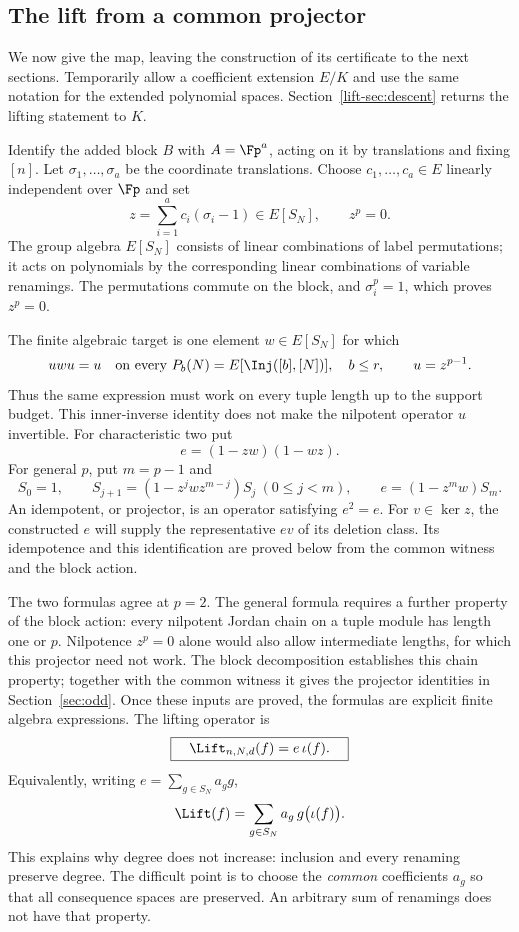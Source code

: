 \subsection{The lift from a common projector}\label{lift-sec:formula}
We now give the map, leaving the construction of its certificate to the
next sections. Temporarily allow a coefficient extension $E/K$ and use
the same notation for the extended polynomial spaces. Section~\ref{lift-sec:descent}
returns the lifting statement to $K$.

Identify the added block $B$ with $A=\Fp^a$, acting on it by translations
and fixing $[n]$. Let $\sigma_1,\ldots,\sigma_a$ be the coordinate
translations. Choose $c_1,\ldots,c_a\in E$ linearly independent over
$\Fp$ and set
\[
 z=\sum_{i=1}^a c_i(\sigma_i-1)\in E[S_N],\qquad z^p=0.
\]
The group algebra $E[S_N]$ consists of linear combinations of label
permutations; it acts on polynomials by the corresponding linear
combinations of variable renamings. The permutations commute on the
block, and $\sigma_i^p=1$, which proves $z^p=0$.

The finite algebraic target is one element $w\in E[S_N]$ for which
\begin{equation}\label{lift-eq:witness}
 u w u=u\quad\text{on every }P_b(N)=E[\Inj([b],[N])],\quad b\le r,
 \qquad u=z^{p-1}.
\end{equation}
Thus the same expression must work on every tuple length up to the
support budget. This inner-inverse identity does not make the
nilpotent operator $u$ invertible. For characteristic two put
\[
                         e=(1-zw)(1-wz).
\]
For general $p$, put $m=p-1$ and
\begin{equation}\label{lift-eq:projector}
 S_0=1,\qquad S_{j+1}=(1-z^jwz^{m-j})S_j\ (0\le j<m),
 \qquad e=(1-z^mw)S_m.
\end{equation}
An idempotent, or projector, is an operator satisfying $e^2=e$.
For $v\in\ker z$, the constructed $e$ will supply the representative
$ev$ of its deletion class. Its idempotence and this identification
are proved below from the common witness and the block action.

The two formulas agree at $p=2$. The general formula requires a further
property of the block action: every nilpotent Jordan chain on a tuple
module has length one or $p$. Nilpotence $z^p=0$ alone would also allow
intermediate lengths, for which this projector need not work. The
block decomposition establishes this chain property; together with
the common witness it gives the projector identities in
Section~\ref{sec:odd}. Once these inputs are
proved, the formulas are explicit finite algebra expressions. The lifting operator is
\begin{equation}\label{lift-eq:actual-lift}
 \boxed{\quad\Lift_{n,N,d}(f)=e\,\iota(f).\quad}
\end{equation}
Equivalently, writing $e=\sum_{g\in S_N}a_g g$,
\[
                    \Lift(f)=\sum_{g\in S_N}a_g\,g\bigl(\iota(f)\bigr).
\]
This explains why degree does not increase: inclusion and every
renaming preserve degree. The difficult point is to choose the
\emph{common} coefficients $a_g$ so that all consequence spaces are
preserved. An arbitrary sum of renamings does not have that property.


